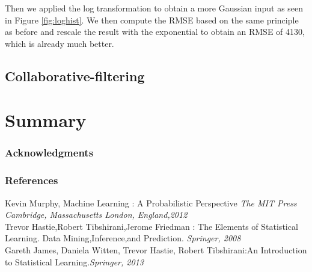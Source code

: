 \documentclass{article} %
\begin{document}
Then we applied the log transformation to obtain a more Gaussian input as seen in Figure \ref{fig:loghist}. We then compute the RMSE based on the same principle as before and rescale the result with the exponential to obtain an RMSE of 4130, which is already much better.

\subsection{Collaborative-filtering}

\section{Summary}

\subsubsection*{Acknowledgments}

\subsubsection*{References}
Kevin Murphy, Machine Learning : A Probabilistic Perspective {\em The MIT Press
Cambridge, Massachusetts
London, England,2012}\\
Trevor Hastie,Robert Tibshirani,Jerome Friedman : The Elements of
Statistical Learning. Data Mining,Inference,and Prediction. {\em Springer, 2008}\\
Gareth James,
Daniela Witten,
Trevor Hastie,
Robert Tibshirani:An Introduction to Statistical Learning.{\em Springer, 2013}
\end{document}
